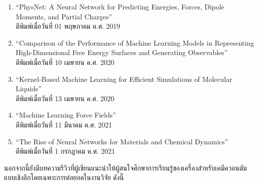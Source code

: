 \begin{enumerate}
    \item \enquote{PhysNet: A Neural Network for Predicting Energies, Forces, Dipole Moments, and 
    Partial Charges}\autocite{unke2019}\\
    ตีพิมพ์เมื่อวันที่ 01 พฤษภาคม ค.ศ. 2019
    
    \item \enquote{Comparison of the Performance of Machine Learning Models in Representing High-Dimensional 
    Free Energy Surfaces and Generating Observables}\autocite{cendagorta2020}\\
    ตีพิมพ์เมื่อวันที่ 10 เมษายน ค.ศ. 2020
    
    \item \enquote{Kernel-Based Machine Learning for Efficient Simulations of Molecular Liquids}\autocite{scherer2020}\\
    ตีพิมพ์เมื่อวันที่ 13 เมษายน ค.ศ. 2020

    \item \enquote{Machine Learning Force Fields}\autocite{unke2021}\\
    ตีพิมพ์เมื่อวันที่ 11 มีนาคม ค.ศ. 2021

    \item \enquote{The Rise of Neural Networks for Materials and Chemical Dynamics}\autocite{kulichenko2021}\\
    ตีพิมพ์เมื่อวันที่ 1 กรกฎาคม ค.ศ. 2021

\end{enumerate}

นอกจากนี้ยังมีบทความรีวิวที่ผู้เขียนแนะนำให้ผู้สนใจศึกษาการเรียนรู้ของเครื่องสำหรับเคมีควอนตัมแบบเชิงลึกโดยเฉพาะการต่อยอดในงานวิจัย ดังนี้


